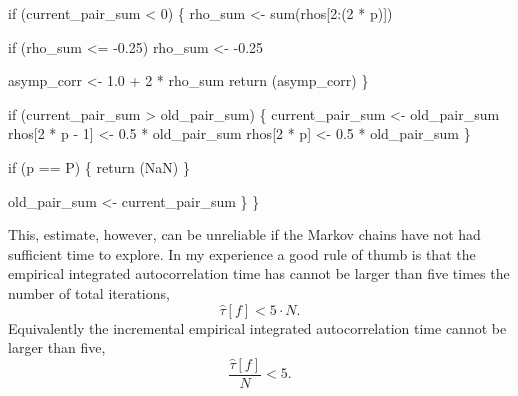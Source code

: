\documentclass[
  letterpaper,
  DIV=11,
  numbers=noendperiod]{scrartcl}
\newenvironment{Shaded}{\begin{snugshade}}{\end{snugshade}}
\newcommand{\BuiltInTok}[1]{\textcolor[rgb]{0.00,0.23,0.31}{#1}}
\newcommand{\ControlFlowTok}[1]{\textcolor[rgb]{0.00,0.23,0.31}{#1}}
\newcommand{\DecValTok}[1]{\textcolor[rgb]{0.68,0.00,0.00}{#1}}
\newcommand{\FloatTok}[1]{\textcolor[rgb]{0.68,0.00,0.00}{#1}}
\newcommand{\NormalTok}[1]{\textcolor[rgb]{0.00,0.23,0.31}{#1}}
\newcommand{\OperatorTok}[1]{\textcolor[rgb]{0.37,0.37,0.37}{#1}}
\begin{document}
\begin{Shaded}
\begin{Highlighting}[]
    \ControlFlowTok{if}\NormalTok{ (current\_pair\_sum }\OperatorTok{\textless{}} \DecValTok{0}\NormalTok{) \{}
\NormalTok{      rho\_sum }\OperatorTok{\textless{}{-}} \BuiltInTok{sum}\NormalTok{(rhos[}\DecValTok{2}\NormalTok{:(}\DecValTok{2} \OperatorTok{*}\NormalTok{ p)])}
    
      \ControlFlowTok{if}\NormalTok{ (rho\_sum }\OperatorTok{\textless{}=} \OperatorTok{{-}}\FloatTok{0.25}\NormalTok{)}
\NormalTok{        rho\_sum }\OperatorTok{\textless{}{-}} \OperatorTok{{-}}\FloatTok{0.25}
    
\NormalTok{      asymp\_corr }\OperatorTok{\textless{}{-}} \FloatTok{1.0} \OperatorTok{+} \DecValTok{2} \OperatorTok{*}\NormalTok{ rho\_sum}
      \ControlFlowTok{return}\NormalTok{ (asymp\_corr)}
\NormalTok{    \}}
  
    \ControlFlowTok{if}\NormalTok{ (current\_pair\_sum }\OperatorTok{\textgreater{}}\NormalTok{ old\_pair\_sum) \{}
\NormalTok{      current\_pair\_sum }\OperatorTok{\textless{}{-}}\NormalTok{ old\_pair\_sum}
\NormalTok{      rhos[}\DecValTok{2} \OperatorTok{*}\NormalTok{ p }\OperatorTok{{-}} \DecValTok{1}\NormalTok{] }\OperatorTok{\textless{}{-}} \FloatTok{0.5} \OperatorTok{*}\NormalTok{ old\_pair\_sum}
\NormalTok{      rhos[}\DecValTok{2} \OperatorTok{*}\NormalTok{ p] }\OperatorTok{\textless{}{-}} \FloatTok{0.5} \OperatorTok{*}\NormalTok{ old\_pair\_sum}
\NormalTok{    \}}
  
    \ControlFlowTok{if}\NormalTok{ (p }\OperatorTok{==}\NormalTok{ P) \{}
      \ControlFlowTok{return}\NormalTok{ (NaN)}
\NormalTok{    \}}
  
\NormalTok{    old\_pair\_sum }\OperatorTok{\textless{}{-}}\NormalTok{ current\_pair\_sum}
\NormalTok{  \}}
\NormalTok{\}}
\end{Highlighting}
\end{Shaded}

This, estimate, however, can be unreliable if the Markov chains have not
had sufficient time to explore. In my experience a good rule of thumb is
that the empirical integrated autocorrelation time has cannot be larger
than five times the number of total iterations, \[
\hat{\tau}[f] < 5 \cdot N.
\] Equivalently the incremental empirical integrated autocorrelation
time cannot be larger than five, \[
\frac{ \hat{\tau}[f] }{N} < 5.
\]
\end{document}
